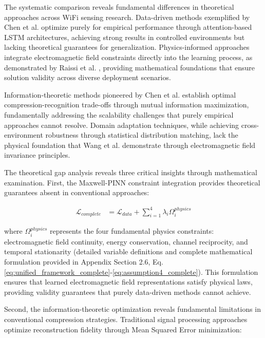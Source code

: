\documentclass[journal]{IEEEtran}
\begin{document}
The systematic comparison reveals fundamental differences in theoretical approaches across WiFi sensing research. Data-driven methods exemplified by Chen et al. \cite{chen2018wifi} optimize purely for empirical performance through attention-based LSTM architectures, achieving strong results in controlled environments but lacking theoretical guarantees for generalization. Physics-informed approaches integrate electromagnetic field constraints directly into the learning process, as demonstrated by Raissi et al. \cite{raissi2019physics}, providing mathematical foundations that ensure solution validity across diverse deployment scenarios.

Information-theoretic methods pioneered by Chen et al. \cite{chen2024efficientfi} establish optimal compression-recognition trade-offs through mutual information maximization, fundamentally addressing the scalability challenges that purely empirical approaches cannot resolve. Domain adaptation techniques, while achieving cross-environment robustness through statistical distribution matching, lack the physical foundation that Wang et al. \cite{wang2022airfi} demonstrate through electromagnetic field invariance principles.

The theoretical gap analysis reveals three critical insights through mathematical examination. First, the Maxwell-PINN constraint integration provides theoretical guarantees absent in conventional approaches:

\begin{align}
\mathcal{L}_{complete} &= \mathcal{L}_{data} + \sum_{i=1}^{4} \lambda_i \Omega_i^{physics} \label{eq:complete_loss}
\end{align}

where $\Omega_i^{physics}$ represents the four fundamental physics constraints: electromagnetic field continuity, energy conservation, channel reciprocity, and temporal stationarity (detailed variable definitions and complete mathematical formulation provided in Appendix Section 2.6, Eq. \ref{eq:unified_framework_complete}-\ref{eq:assumption4_complete}). This formulation ensures that learned electromagnetic field representations satisfy physical laws, providing validity guarantees that purely data-driven methods cannot achieve.

Second, the information-theoretic optimization reveals fundamental limitations in conventional compression strategies. Traditional signal processing approaches optimize reconstruction fidelity through Mean Squared Error minimization:
\end{document}
